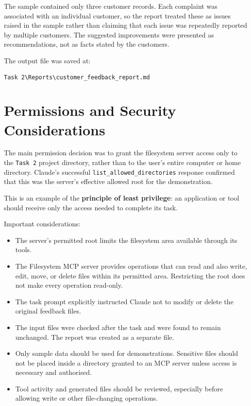 \documentclass[12pt,a4paper]{article}
\begin{document}
	The sample contained only three customer records. Each complaint was associated with an individual customer, so the report treated these as issues raised in the sample rather than claiming that each issue was repeatedly reported by multiple customers. The suggested improvements were presented as recommendations, not as facts stated by the customers.
	
	The output file was saved at:
	\begin{lstlisting}[style=terminal]
		Task 2\Reports\customer_feedback_report.md
	\end{lstlisting}
	
	\section{Permissions and Security Considerations}
	
	The main permission decision was to grant the filesystem server access only to the \texttt{Task 2} project directory, rather than to the user's entire computer or home directory. Claude's successful \texttt{list\_allowed\_directories} response confirmed that this was the server's effective allowed root for the demonstration.
	
	This is an example of the \textbf{principle of least privilege}: an application or tool should receive only the access needed to complete its task.
	
	Important considerations:
	\begin{itemize}
		\item The server's permitted root limits the filesystem area available through its tools.
		\item The Filesystem MCP server provides operations that can read and also write, edit, move, or delete files within its permitted area. Restricting the root does not make every operation read-only.
		\item The task prompt explicitly instructed Claude not to modify or delete the original feedback files.
		\item The input files were checked after the task and were found to remain unchanged. The report was created as a separate file.
		\item Only sample data should be used for demonstrations. Sensitive files should not be placed inside a directory granted to an MCP server unless access is necessary and authorised.
		\item Tool activity and generated files should be reviewed, especially before allowing write or other file-changing operations.
	\end{itemize}
	
\end{document}
